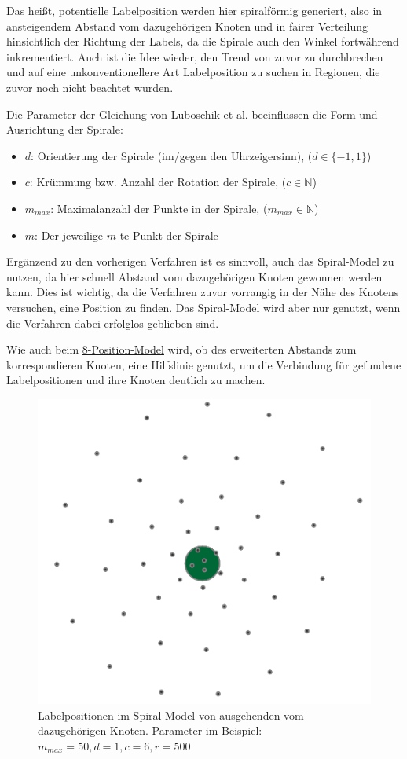 Das heißt, potentielle Labelposition werden hier spiralförmig generiert, also in ansteigendem Abstand vom dazugehörigen Knoten und in fairer Verteilung hinsichtlich der Richtung der Labels, da die Spirale auch den Winkel fortwährend inkrementiert.
Auch ist die Idee wieder, den Trend von zuvor zu durchbrechen und auf eine unkonventionellere Art Labelposition zu suchen in Regionen, die zuvor noch nicht beachtet wurden.

Die Parameter der Gleichung von Luboschik et al.\cite{main} beeinflussen die Form und Ausrichtung der Spirale:
\begin{itemize}
    \item $d$: Orientierung der Spirale (im/gegen den Uhrzeigersinn), ($d \in \{-1, 1 \}$)
    \item $c$: Krümmung bzw. Anzahl der Rotation der Spirale, ($c \in \mathbb{N}$)
    \item $m_{max}$: Maximalanzahl der Punkte in der Spirale, ($m_{max} \in \mathbb{N}$)
    \item $m$: Der jeweilige $m$-te Punkt der Spirale
\end{itemize}

Ergänzend zu den vorherigen Verfahren ist es sinnvoll, auch das Spiral-Model zu nutzen, da hier schnell Abstand vom dazugehörigen Knoten gewonnen werden kann.
Dies ist wichtig, da die Verfahren zuvor vorrangig in der Nähe des Knotens versuchen, eine Position zu finden. Das Spiral-Model wird aber nur genutzt,
wenn die Verfahren dabei erfolglos geblieben sind.

Wie auch beim \hyperref[subsubsec:8pos]{8-Position-Model} wird, ob des erweiterten Abstands zum korrespondieren Knoten, eine Hilfslinie genutzt,
um die Verbindung für gefundene Labelpositionen und ihre Knoten deutlich zu machen.

\begin{figure}[H]
    \centering
    \includegraphics[scale=0.55]{../img/sample}
    \caption{Labelpositionen im Spiral-Model von ausgehenden vom dazugehörigen Knoten.
    Parameter im Beispiel: $m_{max}=50,d=1,c=6,r=500$}
    \label{fig:spiral}
\end{figure}
